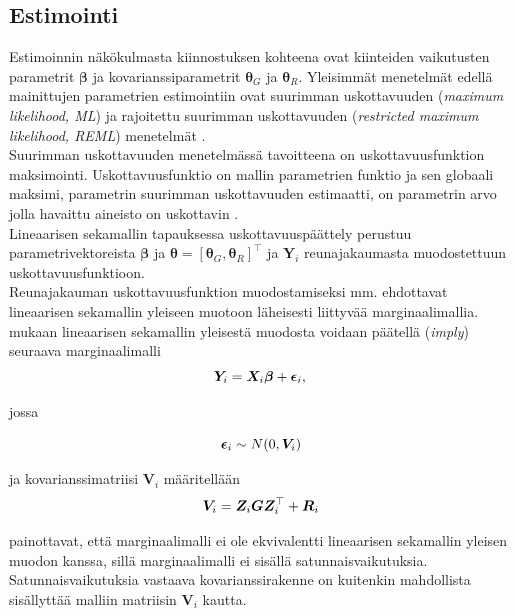 \documentclass[finnish]{docopts}
\begin{document}
\subsection{Estimointi}
\label{sub:estimointi}

Estimoinnin näkökulmasta kiinnostuksen kohteena ovat kiinteiden vaikutusten parametrit $\bm{\beta}$ ja kovarianssiparametrit $\bm{\theta}_G$ ja $\bm{\theta}_R$. Yleisimmät menetelmät edellä mainittujen parametrien estimointiin ovat suurimman uskottavuuden (\textit{maximum likelihood, ML}) ja rajoitettu suurimman uskottavuuden (\textit{restricted maximum likelihood, REML}) menetelmät \cite{west14}. \\

Suurimman uskottavuuden menetelmässä tavoitteena on uskottavuusfunktion maksimointi. Uskottavuusfunktio on mallin parametrien funktio ja sen globaali maksimi, parametrin suurimman uskottavuuden estimaatti, on parametrin arvo jolla havaittu aineisto on uskottavin \cite{casella02}. \\

Lineaarisen sekamallin tapauksessa uskottavuuspäättely perustuu parametrivektoreista $\bm{\beta}$ ja $\bm{\theta} = [\bm{\theta}_G, \bm{\theta}_R]^\top$ ja $\bm{Y}_i$ reunajakaumasta muodostettuun uskottavuusfunktioon. \\

Reunajakauman uskottavuusfunktion muodostamiseksi mm. \cite{west14} ehdottavat lineaarisen sekamallin yleiseen muotoon läheisesti liittyvää marginaalimallia. \cite{west14} mukaan lineaarisen sekamallin yleisestä muodosta voidaan päätellä (\textit{imply}) seuraava marginaalimalli \\

\begin{equation}
\bm{Y}_i = \bm{X}_i \bm{\beta} + \bm{\epsilon}_i, \\
\label{eq:marginaalimalli}
\end{equation}

jossa

$$
\bm{\epsilon}_i \sim N(0,\bm{V}_i) \\
$$

ja kovarianssimatriisi $\bm{V}_i$ määritellään\\

$$
\bm{V}_i = \bm{Z}_i \bm{G} \bm{Z}^\top_i + \bm{R}_i \\
$$

\cite{west14} painottavat, että marginaalimalli ei ole ekvivalentti lineaarisen sekamallin yleisen muodon kanssa, sillä marginaalimalli ei sisällä satunnaisvaikutuksia. Satunnaisvaikutuksia vastaava kovarianssirakenne on kuitenkin mahdollista sisällyttää malliin matriisin $\bm{V}_i$ kautta.\\
\end{document}
